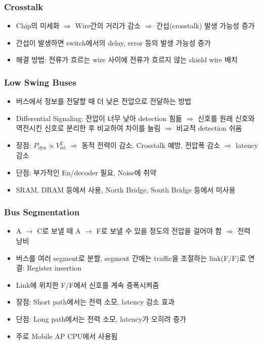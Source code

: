 \subsubsection*{Crosstalk}
\begin{itemize}
    \item Chip의 미세화 $\Rightarrow$ Wire간의 거리가 감소 $\Rightarrow$ 간섭(crosstalk) 발생 가능성 증가
    \item 간섭이 발생하면 switch에서의 delay, error 등의 발생 가능성 증가
    \item 해결 방법: 전류가 흐르는 wire 사이에 전류가 흐르지 않는 shield wire 배치
\end{itemize}

\subsubsection*{Low Swing Buses}
\begin{figures}
\end{figures}
\begin{itemize}
    \item 버스에서 정보를 전달할 때 더 낮은 전압으로 전달하는 방법
    \item Differential Signaling: 전압이 너무 낮아 detection 힘듦 $\Rightarrow$
        신호를 원래 신호와 역전시킨 신호로 분리한 후 비교하여 차이를 늘림 $\Rightarrow$ 비교적 detection 쉬움
    \item 장점: $P_\mathrm{dyn} \varpropto V_{\mathrm{dd}}^2$ $\Rightarrow$ 동적 전력이 감소, Crosstalk 예방, 전압폭 감소 $\Rightarrow$ latency 감소
    \item 단점: 부가적인 En/decoder 필요, Noise에 취약
    \item SRAM, DRAM 등에서 사용, North Bridge, South Bridge 등에서 미사용
\end{itemize}

\subsubsection*{Bus Segmentation}
\begin{figures}
\end{figures}
\begin{itemize}
    \item A $\rightarrow$ C로 보낼 때 A $\rightarrow$ F로 보낼 수 있을 정도의 전압을 걸어야 함 $\Rightarrow$ 전력 낭비
    \item 버스를 여러 segment로 분할, segment 간에는 traffic을 조절하는 link(F/F)로 연결: Register insertion
    \item Link에 위치한 F/F에서 신호를 계속 증폭시켜줌
    \item 장점: Short path에서는 전력 소모, latency 감소 효과
    \item 단점: Long path에서는 전력 소모, latency가 오히려 증가
    \item 주로 Mobile AP CPU에서 사용됨
\end{itemize}

